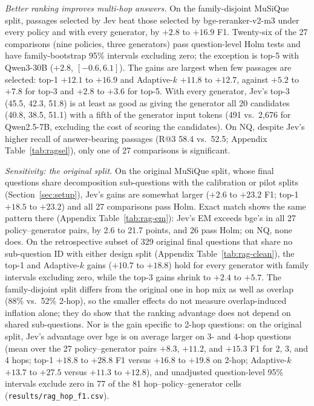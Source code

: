 \emph{Better ranking improves multi-hop answers.} On the family-disjoint MuSiQue split, passages selected by Jev beat those selected by bge-reranker-v2-m3 under every policy and with every generator, by $+2.8$ to $+16.9$ F1. Twenty-six of the 27 comparisons (nine policies, three generators) pass question-level Holm tests and have family-bootstrap 95\% intervals excluding zero; the exception is top-5 with Qwen3-30B ($+2.8$, $[-0.6,6.1]$). The gains are largest when few passages are selected: top-1 $+12.1$ to $+16.9$ and Adaptive-$k$ $+11.8$ to $+12.7$, against $+5.2$ to $+7.8$ for top-3 and $+2.8$ to $+3.6$ for top-5. With every generator, Jev's top-3 (45.5, 42.3, 51.8) is at least as good as giving the generator all 20 candidates (40.8, 38.5, 51.1) with a fifth of the generator input tokens (491 vs.\ 2{,}676 for Qwen2.5-7B, excluding the cost of scoring the candidates). On NQ, despite Jev's higher recall of answer-bearing passages (R@3 58.4 vs.\ 52.5; Appendix Table~\ref{tab:ragsel}), only one of 27 comparisons is significant.

\emph{Sensitivity: the original split.} On the original MuSiQue split, whose final questions share decomposition sub-questions with the calibration or pilot splits (Section~\ref{sec:setup}), Jev's gains are somewhat larger ($+2.6$ to $+23.2$ F1; top-1 $+18.5$ to $+23.2$) and all 27 comparisons pass Holm. Exact match shows the same pattern there (Appendix Table~\ref{tab:rag-em}): Jev's EM exceeds bge's in all 27 policy--generator pairs, by 2.6 to 21.7 points, and 26 pass Holm; on NQ, none does. On the retrospective subset of 329 original final questions that share no sub-question ID with either design split (Appendix Table~\ref{tab:rag-clean}), the top-1 and Adaptive-$k$ gains ($+10.7$ to $+18.8$) hold for every generator with family intervals excluding zero, while the top-3 gains shrink to $+2.4$ to $+5.7$. The family-disjoint split differs from the original one in hop mix as well as overlap (88\% vs.\ 52\% 2-hop), so the smaller effects do not measure overlap-induced inflation alone; they do show that the ranking advantage does not depend on shared sub-questions. Nor is the gain specific to 2-hop questions: on the original split, Jev's advantage over bge is on average larger on 3- and 4-hop questions (mean over the 27 policy--generator pairs $+8.3$, $+11.2$, and $+15.3$ F1 for 2, 3, and 4 hops; top-1 $+18.8$ to $+28.8$ F1 versus $+16.8$ to $+19.8$ on 2-hop; Adaptive-$k$ $+13.7$ to $+27.5$ versus $+11.3$ to $+12.8$), and unadjusted question-level 95\% intervals exclude zero in 77 of the 81 hop--policy--generator cells (\texttt{results/rag\_hop\_f1.csv}).

